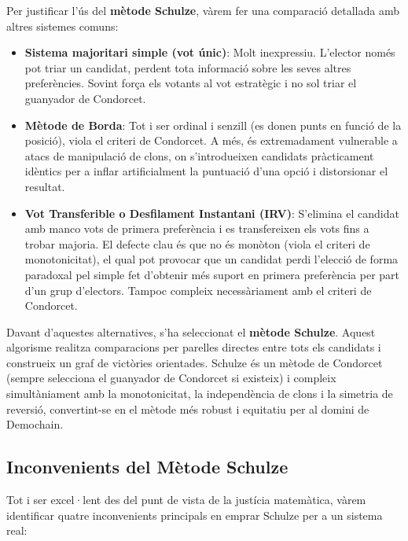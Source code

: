 Per justificar l'ús del \textbf{mètode Schulze}, vàrem fer una comparació detallada amb altres sistemes comuns:
\begin{itemize}
    \item \textbf{Sistema majoritari simple (vot únic)}: Molt inexpressiu.
    L'elector només pot triar un candidat, perdent tota informació sobre les seves altres preferències.
    Sovint força els votants al vot estratègic i no sol triar el guanyador de Condorcet.

    \item \textbf{Mètode de Borda}: Tot i ser ordinal i senzill (es donen punts en funció de la posició), viola el
    criteri de Condorcet.
    A més, és extremadament vulnerable a atacs de manipulació de clons, on s'introdueixen candidats pràcticament
    idèntics per a inflar artificialment la puntuació d'una opció i distorsionar el resultat.

    \item \textbf{Vot Transferible o Desfilament Instantani (IRV)}: S'elimina el candidat amb manco vots de primera
    preferència i es transfereixen els vots fins a trobar majoria.
    El defecte clau és que no és monòton (viola el criteri de monotonicitat), el qual pot provocar que un candidat perdi
    l'elecció de forma paradoxal pel simple fet d'obtenir més suport en primera preferència per part d'un grup
    d'electors.
    Tampoc compleix necessàriament amb el criteri de Condorcet.
\end{itemize}

Davant d'aquestes alternatives, s'ha seleccionat el \textbf{mètode Schulze}.
Aquest algorisme realitza comparacions per parelles directes entre tots els candidats i construeix un graf de victòries
orientades.
Schulze és un mètode de Condorcet (sempre selecciona el guanyador de Condorcet si existeix) i compleix simultàniament
amb la monotonicitat, la independència de clons i la simetria de reversió, convertint-se en el mètode més robust i
equitatiu per al domini de Demochain.

\subsection{Inconvenients del Mètode Schulze}
\label{subsec:inconvenients-schulze}

Tot i ser excel·lent des del punt de vista de la justícia matemàtica, vàrem identificar quatre inconvenients principals
en emprar Schulze per a un sistema real:


